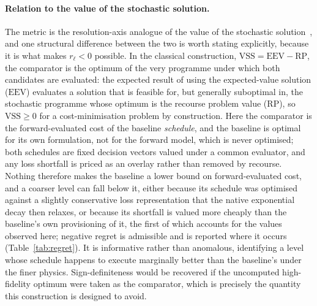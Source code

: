 \documentclass[a4paper,fleqn]{cas-sc}
\begin{document}
\paragraph{Relation to the value of the stochastic solution.}
The metric is the resolution-axis analogue of the value of the stochastic
solution~\citep{BirgeLouveaux2011}, and one structural difference between the two is worth
stating explicitly, because it is what makes \(r_\ell<0\) possible. In the classical
construction, \(\mathrm{VSS}=\mathrm{EEV}-\mathrm{RP}\), the comparator is the optimum of the
very programme under which both candidates are evaluated: the expected result of using the
expected-value solution (\(\mathrm{EEV}\)) evaluates a solution that is feasible for, but
generally suboptimal in, the stochastic programme whose optimum is the recourse problem value
(\(\mathrm{RP}\)), so \(\mathrm{VSS}\ge 0\) for a cost-minimisation problem by
construction. Here the comparator is the forward-evaluated cost of the baseline
\emph{schedule}, and the baseline is optimal for its own formulation, not for the forward
model, which is never optimised; both schedules are fixed decision vectors valued under a
common evaluator, and any loss shortfall is priced as an overlay rather than removed by
recourse. Nothing therefore makes the baseline a lower bound on forward-evaluated cost, and a
coarser level can fall below it, either because its schedule was optimised against a slightly
conservative loss representation that the native exponential decay then relaxes, or because
its shortfall is valued more cheaply than the baseline's own provisioning of it, the first of
which accounts for the values observed here; negative
regret is admissible and is reported where it occurs (Table~\ref{tab:regret}). It is
informative rather than anomalous, identifying a level whose schedule happens to execute
marginally better than the baseline's under the finer physics. Sign-definiteness would be
recovered if the uncomputed high-fidelity optimum were taken as the comparator, which is
precisely the quantity this construction is designed to avoid.
\end{document}
